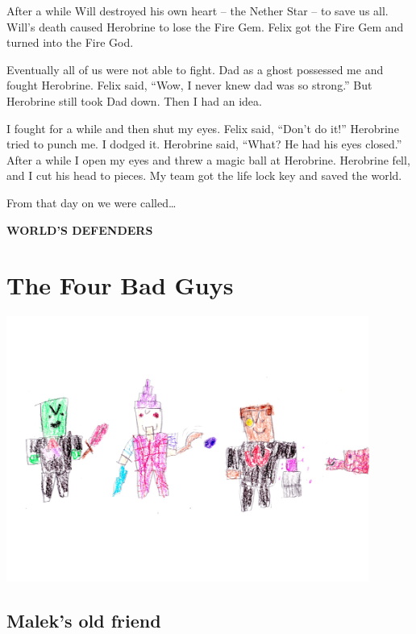 \documentclass[booklet, twoside, 12pt]{krantz}
\begin{document}
After a while Will destroyed his own heart -- the Nether Star -- to save
us all. Will's death caused Herobrine to lose the Fire Gem. Felix got
the Fire Gem and turned into the Fire God.

Eventually all of us were not able to fight. Dad as a ghost possessed me
and fought Herobrine. Felix said, ``Wow, I never knew dad was so
strong.'' But Herobrine still took Dad down. Then I had an idea.

I fought for a while and then shut my eyes. Felix said, ``Don't do it!''
Herobrine tried to punch me. I dodged it. Herobrine said, ``What? He had
his eyes closed.'' After a while I open my eyes and threw a magic ball
at Herobrine. Herobrine fell, and I cut his head to pieces. My team got
the life lock key and saved the world.

From that day on we were called\ldots{}

\textbf{WORLD'S DEFENDERS}

\hypertarget{the-four-bad-guys}{%
\chapter{The Four Bad Guys}\label{the-four-bad-guys}}

\includegraphics[width=4.6875in,height=\textheight]{img/four-bad-guys/05-four-bad-guys.jpg}

\clearpage

\hypertarget{maleks-old-friend}{%
\section{Malek's old friend}\label{maleks-old-friend}}
\end{document}
